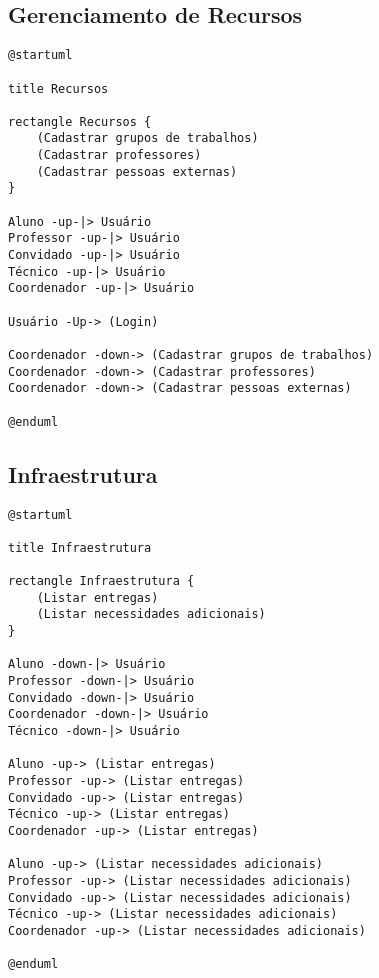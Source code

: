 \subsection{Gerenciamento de Recursos}
\begin{lstlisting}[caption=Descrição do Diagrama de Casos de Uso da parte de Gerenciamento de Recursos, label=recursos-use-case-diagram]
@startuml

title Recursos

rectangle Recursos {
    (Cadastrar grupos de trabalhos)
    (Cadastrar professores)
    (Cadastrar pessoas externas)
}

Aluno -up-|> Usuário
Professor -up-|> Usuário
Convidado -up-|> Usuário
Técnico -up-|> Usuário
Coordenador -up-|> Usuário

Usuário -Up-> (Login)

Coordenador -down-> (Cadastrar grupos de trabalhos)
Coordenador -down-> (Cadastrar professores)
Coordenador -down-> (Cadastrar pessoas externas)

@enduml
\end{lstlisting}

\subsection{Infraestrutura}
\begin{lstlisting}[caption=Descrição do Diagrama de Casos de Uso da parte de Infraestrutura, label=infra-use-case-diagram]
@startuml

title Infraestrutura

rectangle Infraestrutura {
    (Listar entregas)
    (Listar necessidades adicionais)
}

Aluno -down-|> Usuário
Professor -down-|> Usuário
Convidado -down-|> Usuário
Coordenador -down-|> Usuário
Técnico -down-|> Usuário

Aluno -up-> (Listar entregas)
Professor -up-> (Listar entregas)
Convidado -up-> (Listar entregas)
Técnico -up-> (Listar entregas)
Coordenador -up-> (Listar entregas)

Aluno -up-> (Listar necessidades adicionais)
Professor -up-> (Listar necessidades adicionais)
Convidado -up-> (Listar necessidades adicionais)
Técnico -up-> (Listar necessidades adicionais)
Coordenador -up-> (Listar necessidades adicionais)

@enduml
\end{lstlisting}

